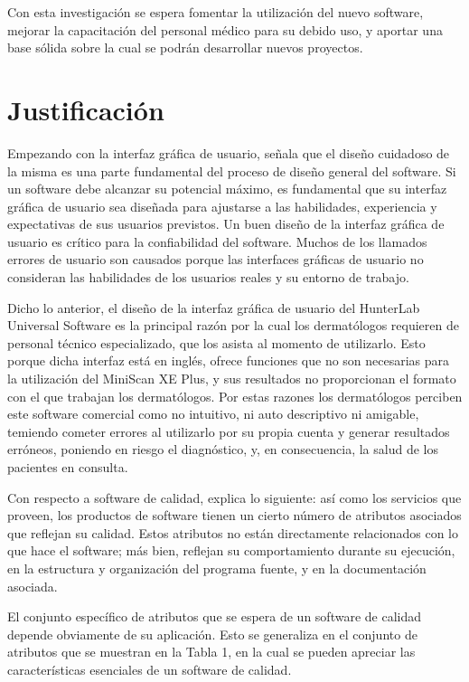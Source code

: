 Con esta investigaci\'{o}n se espera fomentar la utilizaci\'{o}n del nuevo software, mejorar la capacitaci\'{o}n del personal m\'{e}dico para su debido uso, y aportar una base s\'{o}lida sobre la cual se podr\'{a}n desarrollar nuevos proyectos.

	\section{Justificaci\'{o}n}
	
	Empezando con la interfaz gr\'{a}fica de usuario, \cite{Sommerville} se\~{n}ala que el dise\~{n}o cuidadoso de la misma es una parte fundamental del proceso de dise\~{n}o general del software. Si un software debe alcanzar su potencial m\'{a}ximo, es fundamental que su interfaz gr\'{a}fica de usuario sea dise\~{n}ada para ajustarse a las habilidades, experiencia y expectativas de sus usuarios previstos. Un buen dise\~{n}o de la interfaz gr\'{a}fica de usuario es cr\'{i}tico para la confiabilidad del software. Muchos de los llamados errores de usuario son causados porque las interfaces gr\'{a}ficas de usuario no consideran las habilidades de los usuarios reales y su entorno de trabajo.

	Dicho lo anterior, el dise\~{n}o de la interfaz gr\'{a}fica de usuario del HunterLab Universal Software es la principal raz\'{o}n por la cual los dermat\'{o}logos requieren de personal t\'{e}cnico especializado, que los asista al momento de utilizarlo. Esto porque dicha interfaz est\'{a} en ingl\'{e}s, ofrece funciones que no son necesarias para la utilizaci\'{o}n del MiniScan XE Plus, y sus resultados no proporcionan el formato con el que trabajan los dermat\'{o}logos. Por estas razones los dermat\'{o}logos perciben este software comercial como no intuitivo, ni auto descriptivo ni amigable, temiendo cometer errores al utilizarlo por su propia cuenta y generar resultados err\'{o}neos, poniendo en riesgo el diagn\'{o}stico, y, en consecuencia, la salud de los pacientes en consulta.

	Con respecto a software de calidad, \cite{Sommerville} explica lo siguiente: as\'{i} como los servicios que proveen, los productos de software tienen un cierto n\'{u}mero de atributos asociados que reflejan su calidad. Estos atributos no est\'{a}n directamente relacionados con lo que hace el software; m\'{a}s bien, reflejan su comportamiento durante su ejecuci\'{o}n, en la estructura y organizaci\'{o}n del programa fuente, y en la documentaci\'{o}n asociada.

El conjunto espec\'{i}fico de atributos que se espera de un software de calidad depende obviamente de su aplicaci\'{o}n. Esto se generaliza en el conjunto de atributos que se muestran en la Tabla 1, en la cual se pueden apreciar las caracter\'{i}sticas esenciales de un software de calidad.

